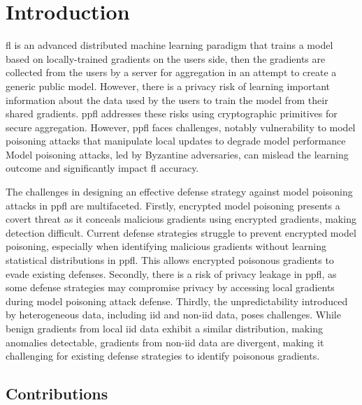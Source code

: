 \section{Introduction}
\label{sec:introduction}

\ac{fl} is an advanced distributed machine learning paradigm that trains a model based on locally-trained gradients on the users side, then the gradients are collected from the users by a server for aggregation in an attempt to create a generic public model.
However, there is a privacy risk of learning important information about the data used by the users to train the model from their shared gradients.
\ac{ppfl} addresses these risks using cryptographic primitives for secure aggregation.
However, \ac{ppfl} faces challenges, notably vulnerability to model poisoning attacks that manipulate local updates to degrade model performance
Model poisoning attacks, led by Byzantine adversaries, can mislead the learning outcome and significantly impact \ac{fl} accuracy.


The challenges in designing an effective defense strategy against model poisoning attacks in \ac{ppfl} are multifaceted.
Firstly, encrypted model poisoning presents a covert threat as it conceals malicious gradients using encrypted gradients, making detection difficult.
Current defense strategies struggle to prevent encrypted model poisoning, especially when identifying malicious gradients without learning statistical distributions in \ac{ppfl}.
This allows encrypted poisonous gradients to evade existing defenses.
Secondly, there is a risk of privacy leakage in \ac{ppfl}, as some defense strategies may compromise privacy by accessing local gradients during model poisoning attack defense.
Thirdly, the unpredictability introduced by heterogeneous data, including \ac{iid} and non-\ac{iid} data, poses challenges.
While benign gradients from local \ac{iid} data exhibit a similar distribution, making anomalies detectable, gradients from non-\ac{iid} data are divergent, making it challenging for existing defense strategies to identify poisonous gradients.



\vspace{-5mm}
\subsection{Contributions}

